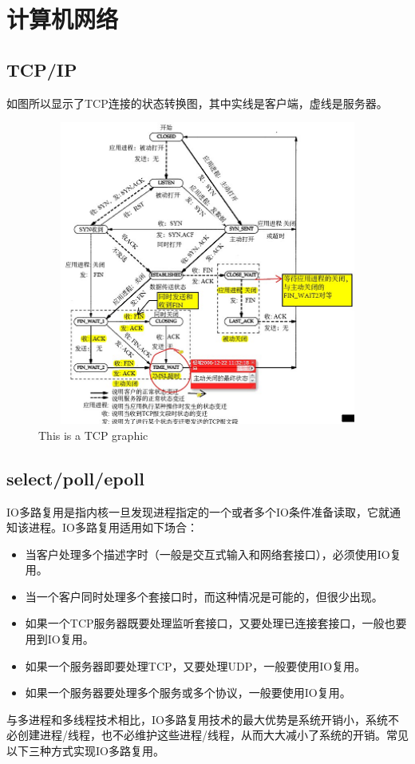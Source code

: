 \chapter{计算机网络}
\section{TCP/IP}
如图所以显示了TCP连接的状态转换图，其中实线是客户端，虚线是服务器。
\begin{figure} 
\centering
\includegraphics[width=12cm,height=10cm]{Image/TCP.png}
\caption{This is a TCP graphic}
\label{fig:tcp}
\end{figure}

\section{select/poll/epoll}
IO多路复用是指内核一旦发现进程指定的一个或者多个IO条件准备读取，它就通知该进程。IO多路复用适用如下场合：
\begin{itemize}
\item 当客户处理多个描述字时（一般是交互式输入和网络套接口），必须使用IO复用。
\item 当一个客户同时处理多个套接口时，而这种情况是可能的，但很少出现。
\item 如果一个TCP服务器既要处理监听套接口，又要处理已连接套接口，一般也要用到IO复用。
\item 如果一个服务器即要处理TCP，又要处理UDP，一般要使用IO复用。
\item 如果一个服务器要处理多个服务或多个协议，一般要使用IO复用。
\end{itemize}
与多进程和多线程技术相比，IO多路复用技术的最大优势是系统开销小，系统不必创建进程/线程，也不必维护这些进程/线程，从而大大减小了系统的开销。常见以下三种方式实现IO多路复用。
